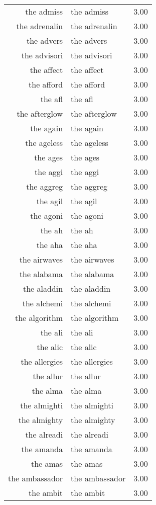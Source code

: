 \begin{table}[ht]
\begin{tabular}{rlr}
  the admiss & the admiss & 3.00 \\ 
  the adrenalin & the adrenalin & 3.00 \\ 
  the advers & the advers & 3.00 \\ 
  the advisori & the advisori & 3.00 \\ 
  the affect & the affect & 3.00 \\ 
  the afford & the afford & 3.00 \\ 
  the afl & the afl & 3.00 \\ 
  the afterglow & the afterglow & 3.00 \\ 
  the again & the again & 3.00 \\ 
  the ageless & the ageless & 3.00 \\ 
  the ages & the ages & 3.00 \\ 
  the aggi & the aggi & 3.00 \\ 
  the aggreg & the aggreg & 3.00 \\ 
  the agil & the agil & 3.00 \\ 
  the agoni & the agoni & 3.00 \\ 
  the ah & the ah & 3.00 \\ 
  the aha & the aha & 3.00 \\ 
  the airwaves & the airwaves & 3.00 \\ 
  the alabama & the alabama & 3.00 \\ 
  the aladdin & the aladdin & 3.00 \\ 
  the alchemi & the alchemi & 3.00 \\ 
  the algorithm & the algorithm & 3.00 \\ 
  the ali & the ali & 3.00 \\ 
  the alic & the alic & 3.00 \\ 
  the allergies & the allergies & 3.00 \\ 
  the allur & the allur & 3.00 \\ 
  the alma & the alma & 3.00 \\ 
  the almighti & the almighti & 3.00 \\ 
  the almighty & the almighty & 3.00 \\ 
  the alreadi & the alreadi & 3.00 \\ 
  the amanda & the amanda & 3.00 \\ 
  the amas & the amas & 3.00 \\ 
  the ambassador & the ambassador & 3.00 \\ 
  the ambit & the ambit & 3.00 \\ 

\end{tabular}
\end{table}
